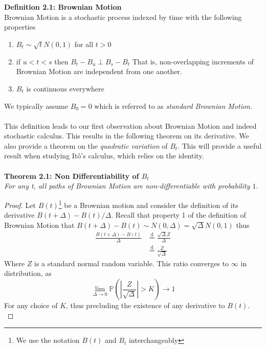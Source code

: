 \documentclass{article}
\begin{document}
\\
\\
\textbf{Definition 2.1: Brownian Motion}\\
Brownian Motion is a stochastic process indexed by time with the following properties \begin{enumerate}
    \item $B_t \sim \sqrt{t}N(0,1)$ for all $t>0$
    \item if $u<t<s$ then $B_t - B_u \perp B_s - B_t$ That is, non-overlapping increments of Brownian Motion are independent from one another.
    \item $B_t$ is continuous everywhere
\end{enumerate}
We typically assume $B_0 = 0$ which is referred to as \textit{standard Brownian Motion}. \\
\\
This definition leads to our first observation about Brownian Motion and indeed stochastic calculus. This results in the following theorem on its derivative. We also provide a theorem on the \textit{quadratic variation} of $B_t$. This will provide a useful result when studying Itô's calculus, which relies on the identity. \\
\\
\textbf{Theorem 2.1: Non Differentiability of $B_t$}\\
\textit{For any t, all paths of Brownian Motion are non-differentiable with probability $1$}. 
\begin{proof}
Let $B(t)$\footnote{We use the notation $B(t)$ and $B_t$ interchangeably} be a Brownian motion and consider the definition of its derivative $B(t+\Delta) -B(t) / \Delta$. Recall that property 1 of the definition of Brownian Motion that $B(t+\Delta) -B(t) \sim N(0, \Delta) = \sqrt{\Delta}N(0,1)$ thus
\begin{align*}
    \frac{B(t+\Delta) -B(t)}{\Delta} &\stackrel{\text{d}}{=} \frac{\sqrt{\Delta} Z}{\Delta} \\
    &\stackrel{\text{d}}{=} \frac{Z}{\sqrt{\Delta}}
\end{align*}
Where $Z$ is a standard normal random variable. This ratio converges to $\infty$ in distribution, as 
$$\lim_{\Delta\longrightarrow0}\mathbb{P}\left( \left| \frac{Z}{\sqrt{\Delta}}\right| >K \right)\longrightarrow1$$
For any choice of $K$, thus precluding the existence of any derivative to $B(t)$. \\
\end{proof}
\end{document}
